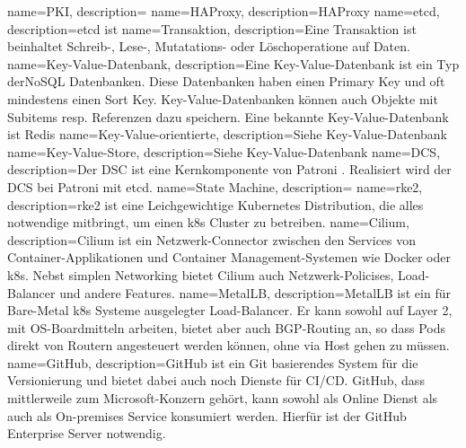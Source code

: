 {
        name=PKI,
        description={}
}
{
        name=HAProxy,
        description={HAProxy \cite{U6F2DWTQ}}
}
{
        name=etcd,
        description={etcd ist \cite{8A4R4E2D}}
}
{
        name=Transaktion,
        description={Eine Transaktion ist beinhaltet Schreib-, Lese-, Mutatations- oder Löschoperatione auf Daten.}
}
{
        name=Key-Value-Datenbank,
        description={Eine Key-Value-Datenbank ist ein Typ der\Gls{NoSQL} Datenbanken.
        Diese Datenbanken haben einen Primary Key und oft mindestens einen Sort Key.
        Key-Value-Datenbanken können auch Objekte mit Subitems resp. Referenzen dazu speichern.
        Eine bekannte Key-Value-Datenbank ist \Gls{Redis}}
}
{
        name=Key-Value-orientierte,
        description={Siehe \Gls{Key-Value-Datenbank}}
}
{
        name=Key-Value-Store,
        description={Siehe \Gls{Key-Value-Datenbank}}
}
{
        name=DCS,
        description={Der DSC ist eine Kernkomponente von Patroni \cite{LVMUNS8P}.
        Realisiert wird der DCS bei Patroni mit \Gls{etcd}.}
}
{
        name=State Machine,
        description={}
}
{
        name=rke2,
        description={rke2 ist eine Leichgewichtige Kubernetes Distribution, die alles notwendige mitbringt, um einen k8s Cluster zu betreiben\cite{F59M6UU2}.}
}
{
        name=Cilium,
        description={Cilium ist ein Netzwerk-Connector zwischen den Services von Container-Applikationen und Container Management-Systemen wie Docker oder k8s.
        Nebst simplen Networking bietet Cilium auch Netzwerk-Policises, Load-Balancer und andere Features\cite{YH7CFGP5,647E9FLZ}.}
}
{
        name=MetalLB,
        description={MetalLB ist ein für Bare-Metal k8s Systeme ausgelegter Load-Balancer.
        Er kann sowohl auf Layer 2, mit OS-Boardmitteln arbeiten, bietet aber auch BGP-Routing an,
        so dass Pods direkt von Routern angesteuert werden können, ohne via Host gehen zu müssen\cite{2B7NV2LT}.}
}
{
        name=GitHub,
        description={GitHub ist ein \Gls{Git} basierendes System für die Versionierung und bietet dabei auch noch Dienste für CI/CD.
        GitHub, dass mittlerweile zum Microsoft-Konzern gehört, kann sowohl als Online Dienst als auch als On-premises Service konsumiert werden.
        Hierfür ist der GitHub Enterprise Server notwendig\cite{R398TJSHB,UL2FJNU}.}
}
